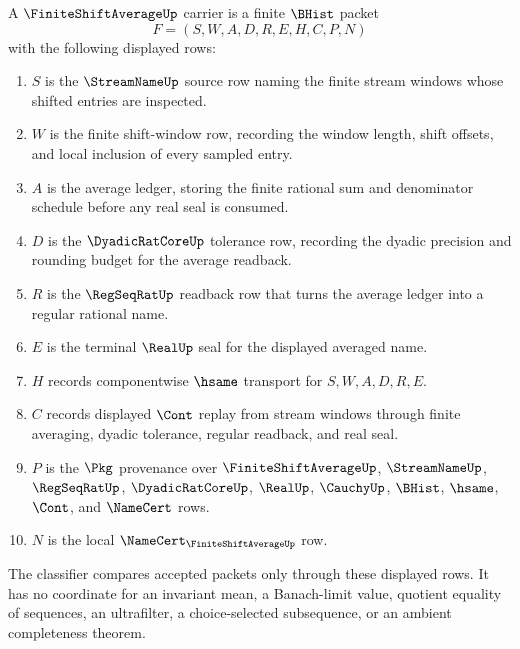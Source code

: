 \begin{definition}
\label{def:finite-shift-average-carrier}
A $\FiniteShiftAverageUp$ carrier is a finite $\BHist$ packet
$$
F=(S,W,A,D,R,E,H,C,P,N)
$$
with the following displayed rows:
\begin{enumerate}
\item $S$ is the $\StreamNameUp$ source row naming the finite stream windows whose shifted entries are inspected.
\item $W$ is the finite shift-window row, recording the window length, shift offsets, and local inclusion of every sampled entry.
\item $A$ is the average ledger, storing the finite rational sum and denominator schedule before any real seal is consumed.
\item $D$ is the $\DyadicRatCoreUp$ tolerance row, recording the dyadic precision and rounding budget for the average readback.
\item $R$ is the $\RegSeqRatUp$ readback row that turns the average ledger into a regular rational name.
\item $E$ is the terminal $\RealUp$ seal for the displayed averaged name.
\item $H$ records componentwise $\hsame$ transport for $S,W,A,D,R,E$.
\item $C$ records displayed $\Cont$ replay from stream windows through finite averaging, dyadic tolerance, regular readback, and real seal.
\item $P$ is the $\Pkg$ provenance over $\FiniteShiftAverageUp$, $\StreamNameUp$, $\RegSeqRatUp$, $\DyadicRatCoreUp$, $\RealUp$, $\CauchyUp$, $\BHist$, $\hsame$, $\Cont$, and $\NameCert$ rows.
\item $N$ is the local $\NameCert_{\FiniteShiftAverageUp}$ row.
\end{enumerate}
The classifier compares accepted packets only through these displayed rows. It has no coordinate for an invariant mean, a Banach-limit value, quotient equality of sequences, an ultrafilter, a choice-selected subsequence, or an ambient completeness theorem.
\end{definition}

